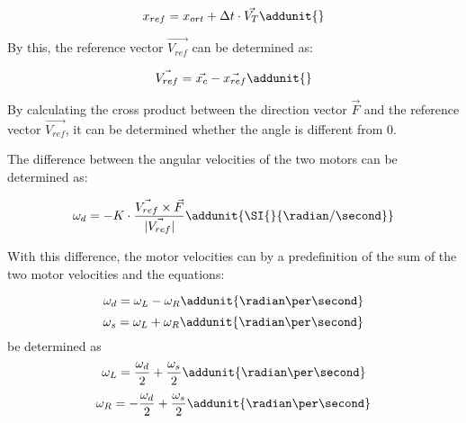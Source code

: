 \begin{equation}
x_{ref} = x_{ort} + \Delta t\cdot \vec{V_T} \addunit{}
\end{equation}

By this, the reference vector $\vec{V_{ref}}$ can be determined as:

\begin{equation}
\vec{V_{ref}} = \vec{x_c} - \vec{x_{ref}} \addunit{}
\end{equation}

By calculating the cross product between the direction vector $\vec{F}$ and the reference vector $\vec{V_{ref}}$, it can be determined whether the angle is different from $0$.

The difference between the angular velocities of the two motors can be determined as:

\begin{equation}
\omega_d = -K \cdot \frac{\vec{V_{ref}}\times \vec{F}}{|\vec{V_{ref}}|} \addunit{\SI{}{\radian/\second}}
\end{equation}

With this difference, the motor velocities can by a predefinition of the sum of the two motor velocities and the equations:

\begin{equation}
\omega_d = \omega_L - \omega_R \addunit{\radian\per\second}
\end{equation}
\begin{equation}
\omega_s = \omega_L + \omega_R \addunit{\radian\per\second}
\end{equation}
be determined as 
\begin{equation}
\omega_L = \frac{\omega_d}{2} + \frac{\omega_s}{2} \addunit{\radian\per\second}
\end{equation}
\begin{equation}
\omega_R = -\frac{\omega_d}{2} + \frac{\omega_s}{2} \addunit{\radian\per\second}
\end{equation}





